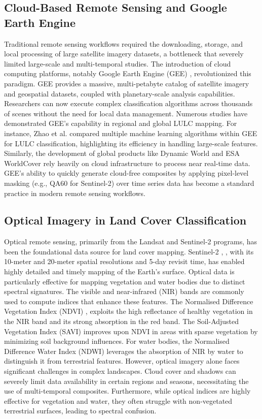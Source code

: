 \documentclass[conference]{IEEEtran}
\begin{document}
\subsection{Cloud-Based Remote Sensing and Google Earth Engine}
Traditional remote sensing workflows required the downloading, storage, and local processing of large satellite imagery datasets, a bottleneck that severely limited large-scale and multi-temporal studies. The introduction of cloud computing platforms, notably Google Earth Engine (GEE) \cite{r10}, revolutionized this paradigm. GEE provides a massive, multi-petabyte catalog of satellite imagery and geospatial datasets, coupled with planetary-scale analysis capabilities. Researchers can now execute complex classification algorithms across thousands of scenes without the need for local data management. 
Numerous studies have demonstrated GEE's capability in regional and global LULC mapping. For instance, Zhao et al. \cite{r3} compared multiple machine learning algorithms within GEE for LULC classification, highlighting its efficiency in handling large-scale features. Similarly, the development of global products like Dynamic World \cite{r15} and ESA WorldCover \cite{r14} rely heavily on cloud infrastructure to process near real-time data. GEE's ability to quickly generate cloud-free composites by applying pixel-level masking (e.g., QA60 for Sentinel-2) over time series data has become a standard practice in modern remote sensing workflows.

\subsection{Optical Imagery in Land Cover Classification}
Optical remote sensing, primarily from the Landsat and Sentinel-2 programs, has been the foundational data source for land cover mapping. Sentinel-2 \cite{r4}, \cite{r5}, with its 10-meter and 20-meter spatial resolutions and 5-day revisit time, has enabled highly detailed and timely mapping of the Earth's surface. 
Optical data is particularly effective for mapping vegetation and water bodies due to distinct spectral signatures. The visible and near-infrared (NIR) bands are commonly used to compute indices that enhance these features. The Normalised Difference Vegetation Index (NDVI) \cite{r1}, \cite{r2} exploits the high reflectance of healthy vegetation in the NIR band and its strong absorption in the red band. The Soil-Adjusted Vegetation Index (SAVI) \cite{r24} improves upon NDVI in areas with sparse vegetation by minimizing soil background influences. For water bodies, the Normalised Difference Water Index (NDWI) \cite{r22} leverages the absorption of NIR by water to distinguish it from terrestrial features.
However, optical imagery alone faces significant challenges in complex landscapes. Cloud cover and shadows can severely limit data availability in certain regions and seasons, necessitating the use of multi-temporal composites. Furthermore, while optical indices are highly effective for vegetation and water, they often struggle with non-vegetated terrestrial surfaces, leading to spectral confusion.
\end{document}
